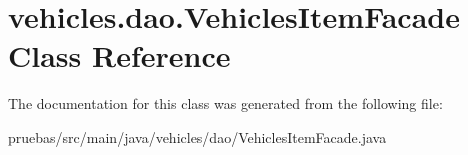 \hypertarget{classvehicles_1_1dao_1_1_vehicles_item_facade}{}\section{vehicles.\+dao.\+Vehicles\+Item\+Facade Class Reference}
\label{classvehicles_1_1dao_1_1_vehicles_item_facade}


The documentation for this class was generated from the following file\+:\begin{DoxyCompactItemize}
\item 
pruebas/src/main/java/vehicles/dao/Vehicles\+Item\+Facade.\+java\end{DoxyCompactItemize}
